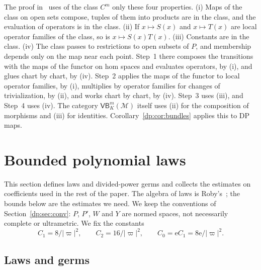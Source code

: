 \documentclass[11pt]{amsart}
\theoremstyle{definition}
\theoremstyle{remark}
\numberwithin{equation}{section}
\newcommand{\abs}[1]{\lvert #1\rvert}
\theoremstyle{plain}
\theoremstyle{definition}
\theoremstyle{plain}
\begin{document}
The proof in~\cite{I} uses of the class $C^m$ only these four properties. (i) Maps of the class on open sets compose, tuples of them into products are in the class, and the evaluation of operators is in the class. (ii) If $x\mapsto S(x)$ and $x\mapsto T(x)$ are local operator families of the class, so is $x\mapsto S(x)T(x)$. (iii) Constants are in the class. (iv) The class passes to restrictions to open subsets of $P$, and membership depends only on the map near each point. Step~1 there composes the transitions with the maps of the functor on hom spaces and evaluates operators, by (i), and glues chart by chart, by (iv). Step~2 applies the maps of the functor to local operator families, by (i), multiplies by operator families for changes of trivialization, by (ii), and works chart by chart, by (iv). Step~3 uses (iii), and Step~4 uses (iv). The category $\mathsf{VB}^m_K(\mathcal M)$ itself uses (ii) for the composition of morphisms and (iii) for identities. Corollary~\ref{dp:cor:bundles} applies this to DP maps.
\section{Bounded polynomial laws}\label{dp:sec:laws}

This section defines laws and divided-power germs and collects the estimates on coefficients used in the rest of the paper. The algebra of laws is Roby's~\cite{Ro}; the bounds below are the estimates we need. We keep the conventions of Section~\ref{dp:sec:conv}: $P$, $P'$, $W$ and $Y$ are normed spaces, not necessarily complete or ultrametric. We fix the constants
\[
 C_1=8/\abs\varpi^2,\qquad C_2=16/\abs\varpi^2,\qquad C_0=\mathrm eC_1=8\mathrm e/\abs\varpi^2.
\]

\subsection{Laws and germs}
\end{document}
